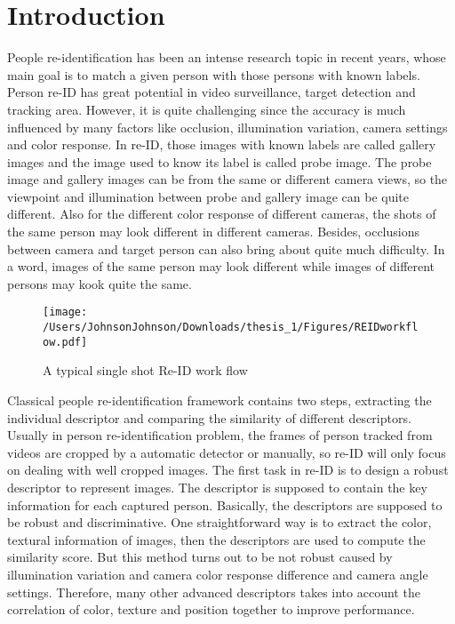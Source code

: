 \chapter{Introduction}

People re-identification has been an intense research topic in recent years, whose main goal is to match a given person with those persons with known labels. Person re-ID has great potential in video surveillance, target detection and tracking area. However, it is quite challenging since the accuracy is much influenced by many factors like occlusion, illumination variation, camera settings and color response. In re-ID, those images with known labels are called gallery images and the image used to know its label is called probe image. The probe image and gallery images can be from the same or different camera views, so the viewpoint and illumination between probe and gallery image can be quite different. Also for the different color response of different cameras, the shots of the same person may look different in different cameras. Besides, occlusions between camera and target person can also bring about quite much difficulty.  In a word, images of the same person may look different while images of different persons may kook quite the same. 


\begin{figure}
\centering
\begin{raggedleft}
\texttt{[image: /Users/JohnsonJohnson/Downloads/thesis\_1/Figures/REIDworkflow.pdf]}
\vspace{1em}
\caption{A typical single shot Re-ID work flow}
\end{raggedleft}

\end{figure}

Classical people re-identification framework contains two steps, extracting the individual descriptor and comparing the similarity of different descriptors. Usually in person re-identification problem, the frames of person tracked from videos are cropped by a automatic detector or manually, so re-ID will only focus on dealing with well cropped images. 
The first task in re-ID is to design a robust descriptor to represent images. The descriptor is supposed to contain the key information for each captured person. Basically, the descriptors are supposed to be robust and discriminative. One straightforward way is to extract the color, textural information of images, then the descriptors are used to compute the similarity score. But this method turns out to be not robust caused by illumination variation  and camera color response difference and camera angle settings.  Therefore, many other advanced descriptors takes into account the correlation of color, texture and position together to improve performance.


